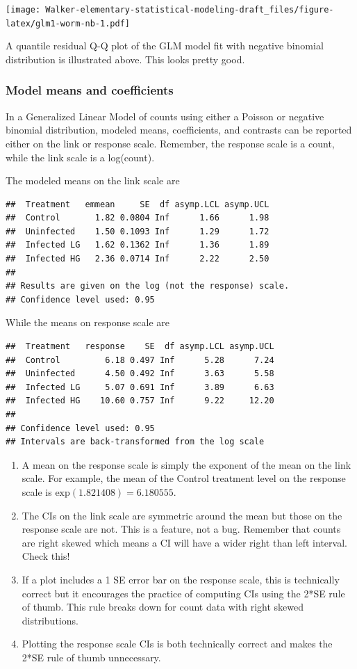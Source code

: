 \documentclass[]{book}
\begin{document}
\texttt{[image: Walker-elementary-statistical-modeling-draft\_files/figure-latex/glm1-worm-nb-1.pdf]}

A quantile residual Q-Q plot of the GLM model fit with negative binomial distribution is illustrated above. This looks pretty good.

\hypertarget{model-means-and-coefficients}{%
\subsubsection{Model means and coefficients}\label{model-means-and-coefficients}}

In a Generalized Linear Model of counts using either a Poisson or negative binomial distribution, modeled means, coefficients, and contrasts can be reported either on the link or response scale. Remember, the response scale is a count, while the link scale is a log(count).

The modeled means on the link scale are

\begin{verbatim}
##  Treatment   emmean     SE  df asymp.LCL asymp.UCL
##  Control       1.82 0.0804 Inf      1.66      1.98
##  Uninfected    1.50 0.1093 Inf      1.29      1.72
##  Infected LG   1.62 0.1362 Inf      1.36      1.89
##  Infected HG   2.36 0.0714 Inf      2.22      2.50
## 
## Results are given on the log (not the response) scale. 
## Confidence level used: 0.95
\end{verbatim}

While the means on response scale are

\begin{verbatim}
##  Treatment   response    SE  df asymp.LCL asymp.UCL
##  Control         6.18 0.497 Inf      5.28      7.24
##  Uninfected      4.50 0.492 Inf      3.63      5.58
##  Infected LG     5.07 0.691 Inf      3.89      6.63
##  Infected HG    10.60 0.757 Inf      9.22     12.20
## 
## Confidence level used: 0.95 
## Intervals are back-transformed from the log scale
\end{verbatim}

\begin{enumerate}
\def\labelenumi{\arabic{enumi}.}
\item
  A mean on the response scale is simply the exponent of the mean on the link scale. For example, the mean of the Control treatment level on the response scale is \(\mathrm{exp}(1.821408) = 6.180555\).
\item
  The CIs on the link scale are symmetric around the mean but those on the response scale are not. This is a feature, not a bug. Remember that counts are right skewed which means a CI will have a wider right than left interval. Check this!
\item
  If a plot includes a 1 SE error bar on the response scale, this is technically correct but it encourages the practice of computing CIs using the 2*SE rule of thumb. This rule breaks down for count data with right skewed distributions.
\item
  Plotting the response scale CIs is both technically correct and makes the 2*SE rule of thumb unnecessary.
\end{enumerate}
\end{document}
